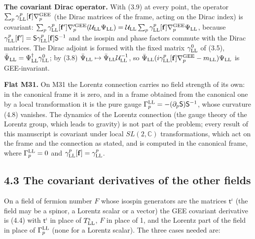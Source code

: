 \documentclass[
  10pt,
]{article}
\begin{document}
\textbf{The covariant Dirac operator.} With (3.9) at every point, the
operator \(\sum_p\gamma^p_{\rm LL}[\mathbf f]\nabla^{\rm GEE}_p\) (the
Dirac matrices of the frame, acting on the Dirac index) is covariant:
\(\sum_p\gamma^p_{\rm LL}[\mathbf f']\nabla'^{\rm GEE}_p(\mathcal U_{\rm LL}\Psi_{\rm LL})=\mathcal U_{\rm LL}\sum_p\gamma^p_{\rm LL}[\mathbf f]\nabla^{\rm GEE}_p\Psi_{\rm LL}\),
because
\(\gamma^p_{\rm LL}[\mathbf f']=\mathsf S\gamma^p_{\rm LL}[\mathbf f]\mathsf S^{-1}\)
and the isospin and phase factors commute with the Dirac matrices. The
Dirac adjoint is formed with the fixed matrix \(\gamma^0_{\rm LL}\) of
(3.5), \(\bar\Psi_{\rm LL}=\Psi^\dagger_{\rm LL}\gamma^0_{\rm LL}\); by
(3.8)
\(\bar\Psi_{\rm LL}\mapsto\bar\Psi_{\rm LL}\mathcal U_{\rm LL}^{-1}\),
so
\(\bar\Psi_{\rm LL}(i\gamma^p_{\rm LL}[\mathbf f]\nabla^{\rm GEE}_p-m_{\rm LL})\Psi_{\rm LL}\)
is GEE-invariant.

\textbf{Flat M31.} On M31 the Lorentz connection carries no field
strength of its own: in the canonical frame it is zero, and in a frame
obtained from the canonical one by a local transformation it is the pure
gauge \(\Gamma^{\rm LL}_p=-(\partial_p\mathsf S)\mathsf S^{-1}\), whose
curvature (4.8) vanishes. The dynamics of the Lorentz connection (the
gauge theory of the Lorentz group, which leads to gravity) is not part
of the problem; every result of this manuscript is covariant under local
\(SL(2,\mathbb C)\) transformations, which act on the frame and the
connection as stated, and is computed in the canonical frame, where
\(\Gamma^{\rm LL}_p=0\) and
\(\gamma^p_{\rm LL}[\mathbf f]=\gamma^p_{\rm LL}\).

\hypertarget{the-covariant-derivatives-of-the-other-fields}{%
\subsection{4.3 The covariant derivatives of the other
fields}\label{the-covariant-derivatives-of-the-other-fields}}

On a field of fermion number \(F\) whose isospin generators are the
matrices \(\mathsf t^\iota\) (the field may be a spinor, a Lorentz
scalar or a vector) the GEE covariant derivative is (4.4) with
\(\mathsf t^\iota\) in place of \(T^\iota_{\rm LL}\), \(F\) in place of
1, and the Lorentz part of the field in place of \(\Gamma^{\rm LL}_p\)
(none for a Lorentz scalar). The three cases needed are:
\end{document}
